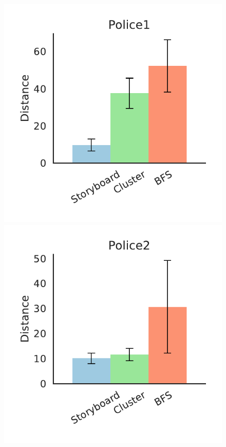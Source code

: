 \begin{figure}[bht]
\label{distance}
\centering
\includegraphics[scale=0.4]{figures/Police1.pdf}
\includegraphics[scale=0.4]{figures/Police2.pdf}

\end{figure}
